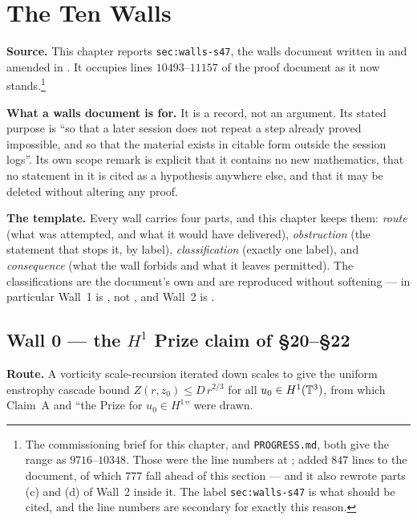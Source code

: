 \chapter{The Ten Walls}
\label{ch:walls}

\begin{record}
\textbf{Source.} This chapter reports \texttt{sec:walls-s47}, the walls
document written in  and amended in . It occupies lines
\(10493\)--\(11157\) of the proof document as it now stands.\footnote{The
commissioning brief for this chapter, and \texttt{PROGRESS.md}, both give the
range as \(9716\)--\(10348\). Those were the line numbers at ; 
added \(847\) lines to the document, of which \(777\) fall ahead of this
section --- and it also rewrote parts (c) and (d) of Wall~2 inside it. The
label \texttt{sec:walls-s47} is what should be cited, and the line numbers are
secondary for exactly this reason.}

\smallskip
\textbf{What a walls document is for.} It is a record, not an argument. Its
stated purpose is ``so that a later session does not repeat a step already
proved impossible, and so that the material exists in citable form outside the
session logs''. Its own scope remark is explicit that it contains no new
mathematics, that no statement in it is cited as a hypothesis anywhere else,
and that it may be deleted without altering any proof.

\smallskip
\textbf{The template.} Every wall carries four parts, and this chapter keeps
them: \emph{route} (what was attempted, and what it would have delivered),
\emph{obstruction} (the statement that stops it, by label),
\emph{classification} (exactly one label), and \emph{consequence} (what the
wall forbids and what it leaves permitted). The classifications are the
document's own and are reproduced without softening --- in particular Wall~1
is \OPEN{}, not \IMPOSSIBLE{}, and Wall~2 is \WITHDRAWN{}.
\end{record}

\section{Wall 0 --- the \texorpdfstring{\(H^1\)}{H1} Prize claim of \S20--\S22}
\label{sec:wall0}

\textbf{Route.} A vorticity scale-recursion iterated down scales to give the
uniform enstrophy cascade bound \(Z(r,z_0)\le D\,r^{2/3}\) for all
\(u_0\in H^1(\mathbb{T}^3)\), from which Claim~A and ``the Prize for \(u_0\in H^1\)''
were drawn.

